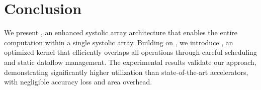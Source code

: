 \section{Conclusion}

We present \MSAGA{}, an enhanced systolic array architecture that enables
the entire \FA{} computation within a single systolic array.
Building on \MSAGA{}, we introduce \SA{}, an optimized kernel that efficiently overlaps all \FA{}
operations through careful scheduling and static dataflow management.
The experimental results validate our approach,
demonstrating significantly higher \FLOPs{} utilization than state-of-the-art accelerators,
with negligible accuracy loss and area overhead.

